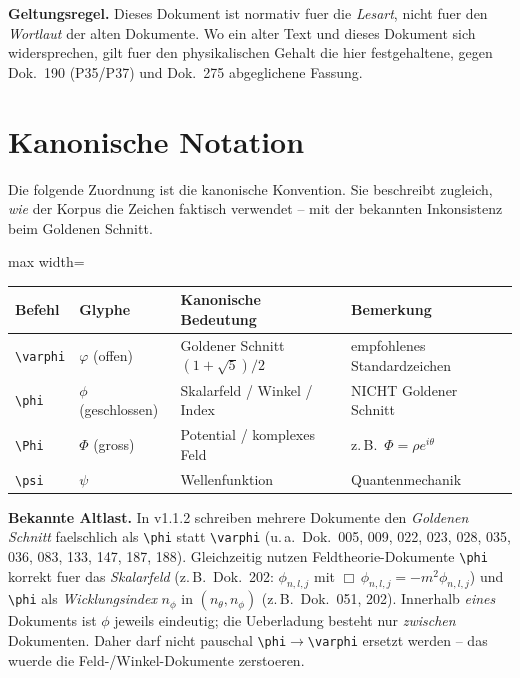 \begin{important}
\textbf{Geltungsregel.} Dieses Dokument ist normativ fuer die \emph{Lesart},
nicht fuer den \emph{Wortlaut} der alten Dokumente. Wo ein alter Text und
dieses Dokument sich widersprechen, gilt fuer den physikalischen Gehalt die
hier festgehaltene, gegen Dok.~190 (P35/P37) und Dok.~275 abgeglichene
Fassung.
\end{important}

\section{Kanonische Notation}

Die folgende Zuordnung ist die kanonische Konvention. Sie beschreibt zugleich,
\emph{wie} der Korpus die Zeichen faktisch verwendet -- mit der bekannten
Inkonsistenz beim Goldenen Schnitt.

\begin{center}
\begin{adjustbox}{max width=\textwidth}
\begin{tabular}{l l l l}
\hline
\textbf{Befehl} & \textbf{Glyphe} & \textbf{Kanonische Bedeutung} & \textbf{Bemerkung} \\
\hline
\verb|\varphi| & $\varphi$ (offen) & Goldener Schnitt $(1+\sqrt5)/2$ & empfohlenes Standardzeichen \\
\verb|\phi|    & $\phi$ (geschlossen) & Skalarfeld / Winkel / Index & NICHT Goldener Schnitt \\
\verb|\Phi|    & $\Phi$ (gross) & Potential / komplexes Feld & z.\,B.\ $\Phi=\rho e^{i\theta}$ \\
\verb|\psi|    & $\psi$ & Wellenfunktion & Quantenmechanik \\
\hline
\end{tabular}
\end{adjustbox}
\end{center}

\begin{caution}
\textbf{Bekannte Altlast.} In v1.1.2 schreiben mehrere Dokumente den
\emph{Goldenen Schnitt} faelschlich als \verb|\phi| statt \verb|\varphi|
(u.\,a.\ Dok.~005, 009, 022, 023, 028, 035, 036, 083, 133, 147, 187, 188).
Gleichzeitig nutzen Feldtheorie-Dokumente \verb|\phi| korrekt fuer das
\emph{Skalarfeld} (z.\,B.\ Dok.~202: $\phi_{n,l,j}$ mit
$\Box\,\phi_{n,l,j}=-m^2\phi_{n,l,j}$) und \verb|\phi| als
\emph{Wicklungsindex} $n_\phi$ in $(n_\theta,n_\phi)$ (z.\,B.\ Dok.~051, 202).
Innerhalb \emph{eines} Dokuments ist $\phi$ jeweils eindeutig; die Ueberladung
besteht nur \emph{zwischen} Dokumenten. Daher darf nicht pauschal
\verb|\phi|$\to$\verb|\varphi| ersetzt werden -- das wuerde die
Feld-/Winkel-Dokumente zerstoeren.
\end{caution}

